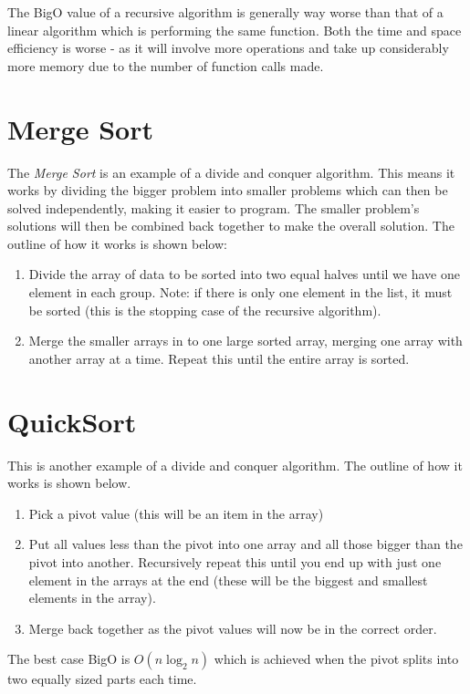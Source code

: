 
The BigO value of a recursive algorithm is generally way worse than that of a linear algorithm which is performing the same function. Both the time and space efficiency is worse - as it will involve more operations and take up considerably more memory due to the number of function calls made.

\section{Merge Sort}
The \textit{Merge Sort} is an example of a divide and conquer algorithm. This means it works by dividing the bigger problem into smaller problems which can then be solved independently, making it easier to program. The smaller problem's solutions will then be combined back together to make the overall solution. The outline of how it works is shown below:
\begin{enumerate}
    \item Divide the array of data to be sorted into two equal halves until we have one element in each group. Note: if there is only one element in the list, it must be sorted (this is the stopping case of the recursive algorithm).
    \item Merge the smaller arrays in to one large sorted array, merging one array with another array at a time. Repeat this until the entire array is sorted.
\end{enumerate}

\section{QuickSort}
This is another example of a divide and conquer algorithm. The outline of how it works is shown below.
\begin{enumerate}
    \item Pick a pivot value (this will be an item in the array)
    \item Put all values less than the pivot into one array and all those bigger than the pivot into another. Recursively repeat this until you end up with just one element in the arrays at the end (these will be the biggest and smallest elements in the array).
    \item Merge back together as the pivot values will now be in the correct order. 
\end{enumerate}
The best case BigO is $O(n\log_2n)$ which is achieved when the pivot splits into two equally sized parts each time.\\

